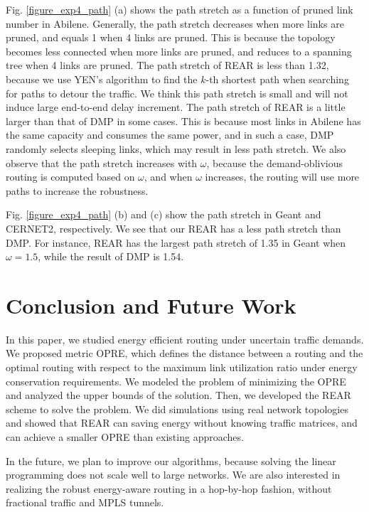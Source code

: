 \documentclass[conference]{IEEEtran}
\begin{document}
Fig. \ref{figure_exp4_path} (a) shows the path stretch as a function of pruned link number in Abilene. Generally, the path stretch decreases when more links are pruned, and equals 1 when 4 links are pruned. This is because the topology becomes less connected when more links are pruned, and reduces to a spanning tree when 4 links are pruned. The path stretch of REAR is less than 1.32, because we use YEN's algorithm to find the $k$-th shortest path when searching for paths to detour the traffic. We think this path stretch is small and will not induce large end-to-end delay increment. The path stretch of REAR is a little larger than that of DMP in some cases. This is because most links in Abilene has the same capacity and consumes the same power, and in such a case, DMP randomly selects sleeping links, which may result in less path stretch. We also observe that the path stretch increases with $\omega$, because the demand-oblivious routing is computed based on $\omega$, and when $\omega$ increases, the routing will use more paths to increase the robustness.

Fig. \ref{figure_exp4_path} (b) and (c) show the path stretch in Geant and CERNET2, respectively. We see that our REAR has a less path stretch than DMP. For instance, REAR has the largest path stretch of 1.35 in Geant when $\omega = 1.5$, while the result of DMP is 1.54.


\section{Conclusion and Future Work}
\label{conclusion}

In this paper, we studied energy efficient routing under uncertain traffic demands. We proposed metric OPRE, which defines the distance between a routing and the optimal routing with respect to the maximum link utilization ratio under energy conservation requirements. We modeled the problem of minimizing the OPRE and analyzed the upper bounds of the solution. Then, we developed the REAR scheme to solve the problem. We did simulations using real network topologies and showed that REAR can saving energy without knowing traffic matrices, and can achieve a smaller OPRE than existing approaches.

In the future, we plan to improve our algorithms, because solving the linear programming does not scale well to large networks. We are also interested in realizing the robust energy-aware routing in a hop-by-hop fashion, without fractional traffic and MPLS tunnels.
\end{document}
